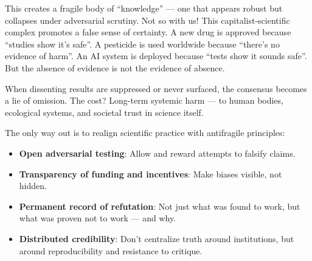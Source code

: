 This creates a fragile body of “knowledge” — one that appears robust but collapses under adversarial scrutiny. Not so with us!  This capitalist-scientific complex promotes a false sense of certainty. A new drug is approved because “studies show it’s safe”. A pesticide is used worldwide because “there’s no evidence of harm”. An AI system is deployed because “tests show it sounds safe”. But the absence of evidence is not the evidence of absence. 

When dissenting results are suppressed or never surfaced, the consensus becomes a lie of omission. The cost? Long-term systemic harm — to human bodies, ecological systems, and societal trust in science itself.

The only way out is to realign scientific practice with antifragile principles:
\begin{itemize}
	\item \textbf{Open adversarial testing}: Allow and reward attempts to falsify claims.
	\item \textbf{Transparency of funding and incentives}: Make biases visible, not hidden.
	\item \textbf{Permanent record of refutation}: Not just what was found to work, but what was proven not to work — and why.
	\item \textbf{Distributed credibility}: Don’t centralize truth around institutions, but around reproducibility and resistance to critique.
\end{itemize}